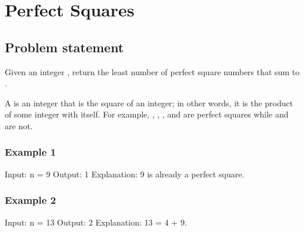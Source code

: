\documentclass[letterpaper,12pt,english]{book}
\begin{document}
\sphinxstepscope


\section{Perfect Squares}
\label{\detokenize{Mathematics/09_MTH_279_Perfect_Squares:perfect-squares}}\label{\detokenize{Mathematics/09_MTH_279_Perfect_Squares::doc}}

\subsection{Problem statement\sphinxfootnotemark[120]}
\label{\detokenize{Mathematics/09_MTH_279_Perfect_Squares:problem-statement}}%
\begin{footnotetext}[120]\sphinxAtStartFootnote
{}
%
\end{footnotetext}\ignorespaces 
\sphinxAtStartPar
Given an integer , return the least number of perfect square numbers that sum to .

\sphinxAtStartPar
A  is an integer that is the square of an integer; in other words, it is the product of some integer with itself. For example, , , , and  are perfect squares while  and  are not.


\subsubsection{Example 1}
\label{\detokenize{Mathematics/09_MTH_279_Perfect_Squares:example-1}}
\begin{sphinxVerbatim}[commandchars=\\\{\}]
Input: n = 9
Output: 1
Explanation: 9 is already a perfect square.
\end{sphinxVerbatim}


\subsubsection{Example 2}
\label{\detokenize{Mathematics/09_MTH_279_Perfect_Squares:example-2}}
\begin{sphinxVerbatim}[commandchars=\\\{\}]
Input: n = 13
Output: 2
Explanation: 13 = 4 + 9.
\end{sphinxVerbatim}
\end{document}

